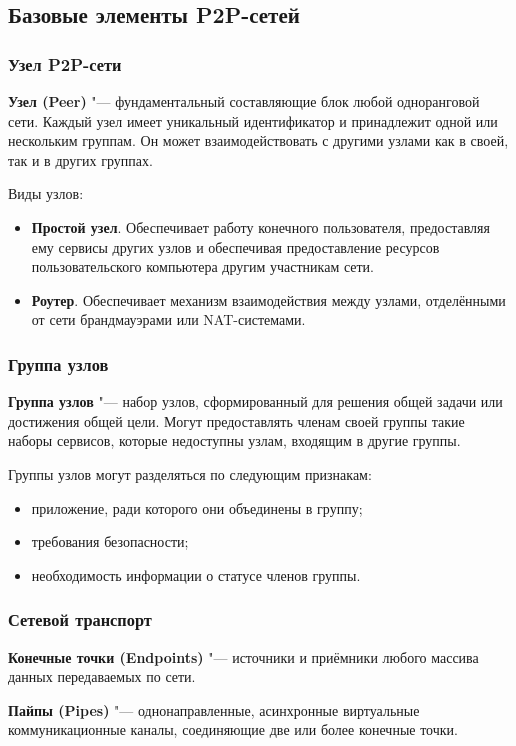 \documentclass[bachelor, och, coursework]{SCWorks}
\begin{document}
\subsection{Базовые элементы P2P-сетей}
\subsubsection{Узел P2P-сети}
\textbf{Узел (Peer)} "--- фундаментальный составляющие блок любой одноранговой сети. 
Каждый узел имеет уникальный идентификатор и принадлежит одной или нескольким группам. 
Он может взаимодействовать с другими узлами как в своей, так и в других группах. \cite{P2P_2}

Виды узлов:
\begin{itemize}
    \item \textbf{Простой узел}. Обеспечивает работу конечного пользователя, предоставляя ему сервисы других узлов и	
    обеспечивая предоставление ресурсов пользовательского компьютера другим	участникам сети.
    \item \textbf{Роутер}. Обеспечивает механизм взаимодействия между узлами, отделёнными от сети брандмауэрами или NAT-системами.	
\end{itemize}

\subsubsection{Группа узлов}
\textbf{Группа узлов} "--- набор узлов, сформированный для решения общей задачи или достижения общей цели. 
Могут предоставлять членам своей группы такие наборы сервисов, которые недоступны узлам, входящим в другие группы.

Группы узлов могут разделяться по следующим признакам:
\begin{itemize}
    \item приложение, ради которого они объединены в группу;
    \item требования безопасности;
    \item необходимость информации о статусе членов группы.
\end{itemize}

\subsubsection{Сетевой транспорт}
\textbf{Конечные точки (Endpoints)} "--- источники и приёмники любого массива данных передаваемых по сети.

\textbf{Пайпы (Pipes)} "--- однонаправленные, асинхронные виртуальные коммуникационные каналы, соединяющие две или более конечные точки.
\end{document}
